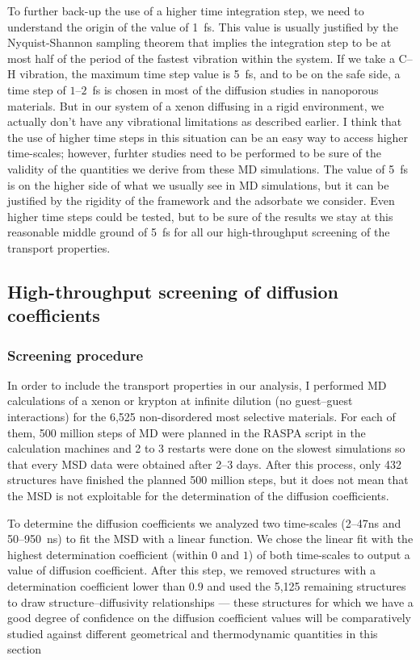 \documentclass[main]{subfiles}
\begin{document}
To further back-up the use of a higher time integration step, we need to understand the origin of the value of \SI{1}{\fs}. This value is usually justified by the Nyquist-Shannon sampling theorem that implies the integration step to be at most half of the period of the fastest vibration within the system. If we take a C--H vibration, the maximum time step value is \SI{5}{\fs}, and to be on the safe side, a time step of $1$--$2$~\si{\fs} is chosen in most of the diffusion studies in nanoporous materials.\autocite{Bukowski_2021} But in our system of a xenon diffusing in a rigid environment, we actually don't have any vibrational limitations as described earlier. I think that the use of higher time steps in this situation can be an easy way to access higher time-scales; however, furhter studies need to be performed to be sure of the validity of the quantities we derive from these MD simulations. The value of \SI{5}{\fs} is on the higher side of what we usually see in MD simulations, but it can be justified by the rigidity of the framework and the adsorbate we consider. Even higher time steps could be tested, but to be sure of the results we stay at this reasonable middle ground of \SI{5}{\fs} for all our high-throughput screening of the transport properties.


\subsection{High-throughput screening of diffusion coefficients}

\subsubsection{Screening procedure}

In order to include the transport properties in our analysis, I performed MD calculations of a xenon or krypton at infinite dilution (no guest--guest interactions) for the 6,525 non-disordered most selective materials. For each of them, 500 million steps of MD were planned in the RASPA script in the calculation machines and 2 to 3 restarts were done on the slowest simulations so that every MSD data were obtained after 2--3 days. After this process, only 432 structures have finished the planned 500 million steps, but it does not mean that the MSD is not exploitable for the determination of the diffusion coefficients. 

To determine the diffusion coefficients we analyzed two time-scales (2--47\si{\ns} and 50--950~\si{\ns}) to fit the MSD with a linear function. We chose the linear fit with the highest determination coefficient (within $0$ and $1$) of both time-scales to output a value of diffusion coefficient. After this step, we removed structures with a determination coefficient lower than $0.9$ and used the 5,125 remaining structures to draw structure--diffusivity relationships --- these structures for which we have a good degree of confidence on the diffusion coefficient values will be comparatively studied against different geometrical and thermodynamic quantities in this section
\end{document}
